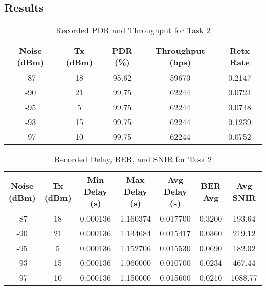 \documentclass{rapport}
\begin{document}
\subsection{Results}
\begin{table}[H]
\centering
\caption{Recorded PDR and Throughput for Task 2}
\begin{tabular}{|c|c|c|c|c|}
\hline
Noise (dBm) & Tx (dBm) & PDR (\%) & Throughput (bps) & Retx Rate \\
\hline
-87 & 18 & 95.62 & 59670  & 0.2147 \\
-90 & 21 & 99.75 & 62244  & 0.0724 \\
-95 & 5  & 99.75 & 62244  & 0.0748 \\
-93 & 15 & 99.75 & 62244  & 0.1239 \\
-97 & 10 & 99.75 & 62244  & 0.0752 \\
\hline
\end{tabular}
\end{table}

\begin{table}[H]
\centering
\caption{Recorded Delay, BER, and SNIR for Task 2}
\begin{tabular}{|c|c|c|c|c|c|c|}
\hline
Noise (dBm) & Tx (dBm) & Min Delay (s) & Max Delay (s) & Avg Delay (s) & BER Avg & Avg SNIR \\
\hline
-87 & 18 & 0.000136 & 1.160374 & 0.017700 & 0.3200 & 193.64 \\
-90 & 21 & 0.000136 & 1.134684 & 0.015417 & 0.0360 & 219.12 \\
-95 & 5  & 0.000136 & 1.152706 & 0.015530 & 0.0690 & 182.02 \\
-93 & 15 & 0.000136 & 1.060000 & 0.010700 & 0.0234 & 467.44 \\
-97 & 10 & 0.000136 & 1.150000 & 0.015600 & 0.0210 & 1088.77 \\
\hline
\end{tabular}
\end{table}
\end{document}
